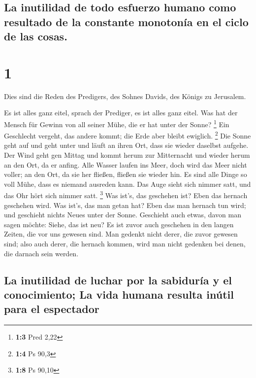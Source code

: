 \hypertarget{la-inutilidad-de-todo-esfuerzo-humano-como-resultado-de-la-constante-monotonuxeda-en-el-ciclo-de-las-cosas.}{%
\subsection{La inutilidad de todo esfuerzo humano como resultado de la
constante monotonía en el ciclo de las
cosas.}\label{la-inutilidad-de-todo-esfuerzo-humano-como-resultado-de-la-constante-monotonuxeda-en-el-ciclo-de-las-cosas.}}

\hypertarget{section}{%
\section{1}\label{section}}

 Dies sind die Reden des Predigers, des Sohnes Davids, des
Königs zu Jerusalem.

 Es ist alles ganz eitel, sprach der Prediger, es ist
alles ganz eitel.  Was hat der Mensch für Gewinn von all
seiner Mühe, die er hat unter der Sonne? \footnote{\textbf{1:3} Pred
  2,22}  Ein Geschlecht vergeht, das andere kommt; die
Erde aber bleibt ewiglich. \footnote{\textbf{1:4} Ps 90,3}
 Die Sonne geht auf und geht unter und läuft an ihren Ort,
dass sie wieder daselbst aufgehe.  Der Wind geht gen
Mittag und kommt herum zur Mitternacht und wieder herum an den Ort, da
er anfing.  Alle Wasser laufen ins Meer, doch wird das
Meer nicht voller; an den Ort, da sie her fließen, fließen sie wieder
hin.  Es sind alle Dinge so voll Mühe, dass es niemand
ausreden kann. Das Auge sieht sich nimmer satt, und das Ohr hört sich
nimmer satt. \footnote{\textbf{1:8} Ps 90,10}  Was ist's,
das geschehen ist? Eben das hernach geschehen wird. Was ist's, das man
getan hat? Eben das man hernach tun wird; und geschieht nichts Neues
unter der Sonne.  Geschieht auch etwas, davon man sagen
möchte: Siehe, das ist neu? Es ist zuvor auch geschehen in den langen
Zeiten, die vor uns gewesen sind.  Man gedenkt nicht
derer, die zuvor gewesen sind; also auch derer, die hernach kommen, wird
man nicht gedenken bei denen, die darnach sein werden.

\hypertarget{la-inutilidad-de-luchar-por-la-sabiduruxeda-y-el-conocimiento-la-vida-humana-resulta-inuxfatil-para-el-espectador}{%
\subsection{La inutilidad de luchar por la sabiduría y el conocimiento;
La vida humana resulta inútil para el
espectador}\label{la-inutilidad-de-luchar-por-la-sabiduruxeda-y-el-conocimiento-la-vida-humana-resulta-inuxfatil-para-el-espectador}}


